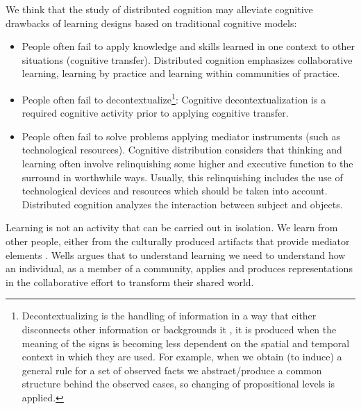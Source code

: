 \documentclass[10pt,twocolumn,ieeetran]{article}
\begin{document}
We think that the study of distributed cognition may alleviate cognitive drawbacks of learning designs based on traditional cognitive models: 

\begin{itemize}

\item People often fail to apply knowledge and skills learned in one context to other situations \cite{Perkins} (cognitive transfer). Distributed cognition emphasizes collaborative learning, learning by practice and learning within communities of practice.

\item People often fail to decontextualize\footnote{Decontextualizing \cite{Wertsch} is the handling of information in a way that either disconnects other information or backgrounds it \cite{Denny}, it is produced when the meaning of the signs is becoming less dependent on the spatial and temporal context in which they are used. For example, when we obtain (to induce) a general rule for a set of observed facts we abstract/produce a common structure behind the observed cases, so changing of propositional levels is applied.}: Cognitive decontextualization is a required cognitive activity prior to applying cognitive transfer.  

\item People often fail to solve problems applying mediator instruments (such as technological resources).
Cognitive distribution considers that thinking and learning often involve relinquishing some higher and executive function to the surround in worthwhile ways. Usually, this relinquishing includes the use of technological devices and resources which should be taken into account. Distributed cognition analyzes the interaction between subject and objects.   
\end{itemize}









Learning is not an activity that can be carried out in isolation. We learn from other people, either from the culturally produced artifacts that provide mediator elements \cite{Wells}. Wells \cite{Wells}  argues that to understand learning we need to understand how an individual, as a member of a community, applies and produces representations in the collaborative effort to transform their shared world.
\end{document}

